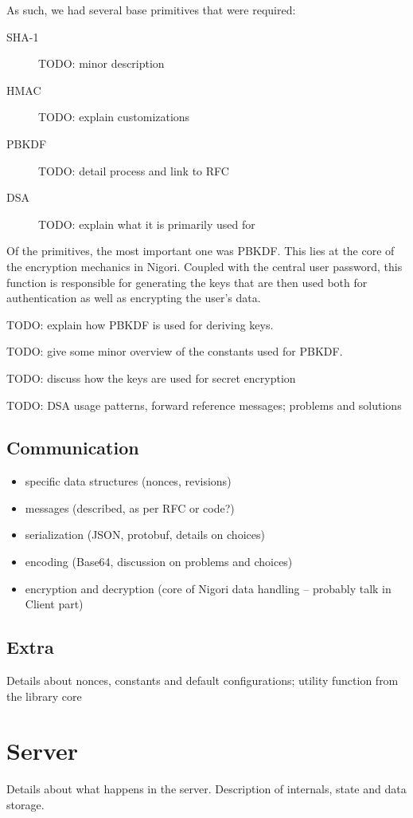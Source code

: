 As such, we had several base primitives that were required:
\begin{description}
  \item[SHA-1] TODO: minor description
  \item[HMAC] TODO: explain customizations
  \item[PBKDF] TODO: detail process and link to RFC
  \item[DSA] TODO: explain what it is primarily used for
\end{description}

Of the primitives, the most important one was PBKDF.
This lies at the core of the encryption mechanics in Nigori.
Coupled with the central user password, this function is responsible for generating the keys that are then used both for authentication as well as encrypting the user's data.

TODO: explain how PBKDF is used for deriving keys.

TODO: give some minor overview of the constants used for PBKDF.

TODO: discuss how the keys are used for secret encryption

TODO: DSA usage patterns, forward reference messages; problems and solutions

\subsection{Communication}
\begin{itemize}
  \item specific data structures (nonces, revisions)
  \item messages (described, as per RFC or code?)
  \item serialization (JSON, protobuf, details on choices)
  \item encoding (Base64, discussion on problems and choices)
  \item encryption and decryption (core of Nigori data handling -- probably talk in Client part)
\end{itemize}

\subsection{Extra}
Details about nonces, constants and default configurations; utility function from the library core

\section{Server}
Details about what happens in the server.
Description of internals, state and data storage.

